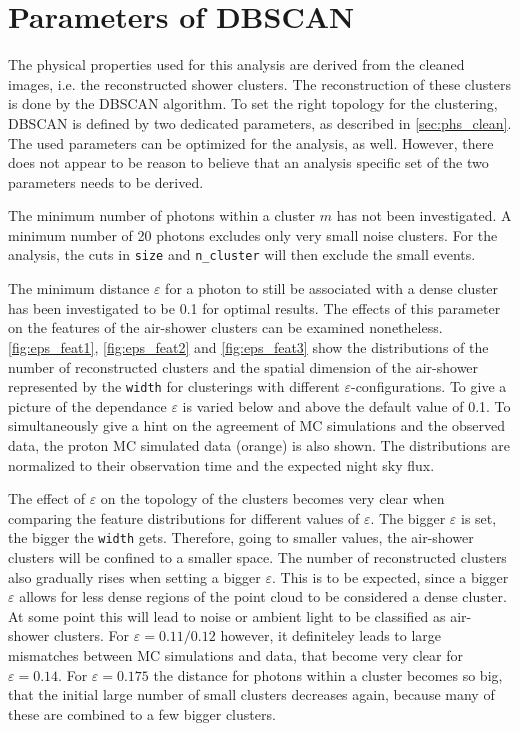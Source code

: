 \section{Parameters of DBSCAN}
%
The physical properties used for this analysis are derived from the cleaned
images, i.e. the reconstructed shower clusters. The reconstruction of these
clusters is done by the DBSCAN algorithm. To set the right topology for the
clustering, DBSCAN is defined by two dedicated parameters, as described in
\autoref{sec:phs_clean}. The used parameters can be optimized for the analysis,
as well. However, there does not appear to be reason to believe that an
analysis specific set of the two parameters needs to be derived.

The minimum number of photons within a cluster $m$ has not been investigated. A
minimum number of \num{20} photons excludes only very small noise clusters. For
the analysis, the cuts in \texttt{size} and \texttt{n\_cluster} will then
exclude the small events.

The minimum distance $\varepsilon$ for a photon to still be associated with a
dense cluster has been investigated to be \num{0.1} for optimal results. The
effects of this parameter on the features of the air-shower clusters can be
examined nonetheless. \autoref{fig:eps_feat1}, \ref{fig:eps_feat2} and
\ref{fig:eps_feat3} show the distributions of the number of reconstructed
clusters and the spatial dimension of the air-shower represented by the
\texttt{width} for clusterings with different $\varepsilon$-configurations. To
give a picture of the dependance $\varepsilon$ is varied below and above the
default value of \num{0.1}. To simultaneously give a hint on the agreement of
MC simulations and the observed data, the proton MC simulated data (orange) is
also shown. The distributions are normalized to their observation time and the
expected night sky flux.

The effect of $\varepsilon$ on the topology of the clusters becomes very clear
when comparing the feature distributions for different values of $\varepsilon$.
The bigger $\varepsilon$ is set, the bigger the \texttt{width} gets. Therefore,
going to smaller values, the air-shower clusters will be confined to a smaller
space. The number of reconstructed clusters also gradually rises when setting
a bigger $\varepsilon$. This is to be expected, since a bigger $\varepsilon$
allows for less dense regions of the point cloud to be considered a dense
cluster. At some point this will lead to noise or ambient light to be
classified as air-shower clusters. For $\varepsilon = 0.11 / 0.12$ however, it
definiteley leads to large mismatches between MC simulations and data, that
become very clear for $\varepsilon = 0.14$. For $\varepsilon = 0.175$ the
distance for photons within a cluster becomes so big, that the initial large
number of small clusters decreases again, because many of these are combined to
a few bigger clusters.

